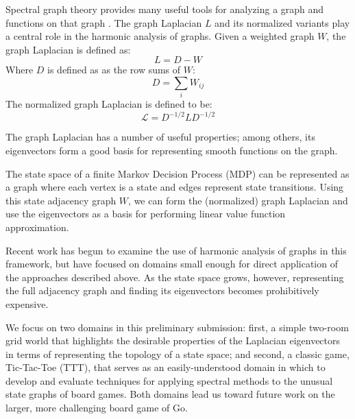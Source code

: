 Spectral graph theory provides many useful tools for analyzing a graph and
functions on that graph \citep{Chung1997Spectral}. The graph Laplacian $L$ and
its normalized variants play a central role in the harmonic analysis of graphs.
Given a weighted graph $W$, the graph Laplacian is defined as:
%
\begin{equation}
L = D-W
\end{equation}
%
Where $D$ is defined as as the row sums of $W$:
%
\begin{equation}
D = \sum_{i} W_{ij}
\end{equation}
%
The normalized graph Laplacian is defined to be:
%
\begin{equation}
\mathcal{L} = D^{-1/2}LD^{-1/2}
\label{eqn:norm.laplacian}
\end{equation}

The graph Laplacian has a number of useful properties; among others, its
eigenvectors form a good basis for representing smooth functions on the graph.

The state space of a finite Markov Decision Process (MDP) can be represented
as a graph where each vertex is a state and edges represent state transitions.
Using this state adjacency graph $W$, we can form the (normalized) graph 
Laplacian and use the eigenvectors as a basis for performing linear value 
function approximation.

Recent work \citep{Wang2009Multiscale,Mahadevan2006Value,Coifman06Diffusion}
has begun to examine the use of harmonic analysis of graphs in this framework,
but have focused on domains small enough for direct application of the
approaches described above. As the state space grows, however, representing the
full adjacency graph and finding its eigenvectors becomes prohibitively
expensive. 

We focus on two domains in this preliminary submission: first, a simple
two-room grid world that highlights the desirable properties of the Laplacian
eigenvectors in terms of representing the topology of a state space; and
second, a classic game, Tic-Tac-Toe (TTT), that serves as an easily-understood
domain in which to develop and evaluate techniques for applying spectral
methods to the unusual state graphs of board games. Both domains lead us toward
future work on the larger, more challenging board game of Go.

